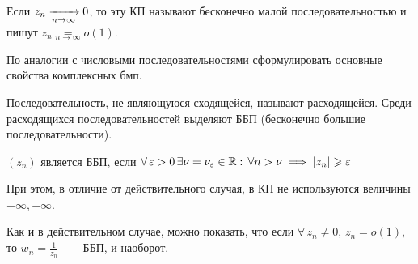 \documentclass[../../main.tex]{subfiles}
\begin{document}
Если $ z_n \xrightarrow[n \rightarrow \infty]{} 0 $, то эту КП называют бесконечно малой последовательностью и пишут $ z_n \underset{n \to \infty}{=} o(1) $.

\begin{exc}
	По аналогии с числовыми последовательностями сформулировать основные свойства комплексных бмп.
\end{exc}

\;

Последовательность, не являющуюся сходящейся, называют расходящейся. Среди расходящихся последовательностей выделяют ББП (бесконечно большие последовательности).

$ (z_n) $ является ББП, если $ \forall\, \varepsilon > 0\, \exists \nu = \nu_\varepsilon \in \mathbb{R}:\, \forall n > \nu \implies |z_n| \geqslant \varepsilon $

При этом, в отличие от действительного случая, в КП не используются величины $ +\infty, -\infty $.

Как и в действительном случае, можно показать, что если $ \forall\, z_n \neq 0,\, z_n = o(1) $, то $ w_n = \frac{1}{z_n} $ ~--- ББП, и наоборот.
\end{document}
